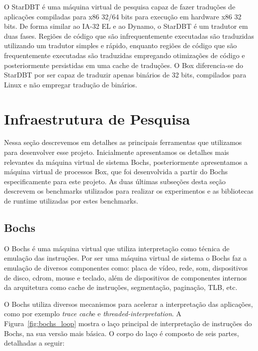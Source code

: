 \documentclass[11pt,twoside]{article}
\begin{document}
O StarDBT \cite{Wang2007} é uma máquina virtual de pesquisa capaz de fazer
traduções de aplicações compiladas para x86 32/64 bits para execução em hardware
x86 32 bits. De forma similar ao IA-32 EL e ao Dynamo, o StarDBT é um tradutor
em duas fases. Regiões de código que são infrequentemente executadas são
traduzidas utilizando um tradutor simples e rápido, enquanto regiões de código
que são frequentemente executadas são traduzidas empregando otimizações de
código e posteriormente persistidas em uma cache de traduções. O Box
diferencia-se do StarDBT por ser capaz de traduzir apenas binários de 32 bits,
compilados para Linux e não empregar tradução de binários.



\section{Infraestrutura de Pesquisa} \label{sec:infraestrutura}

Nessa seção descrevemos em detalhes as principais ferramentas que utilizamos
para desenvolver esse projeto. Inicialmente apresentamos os detalhes mais
relevantes da máquina virtual de sistema Bochs, posteriormente apresentamos a
máquina virtual de processos Box, que foi desenvolvida a partir do Bochs
especificamente para este projeto.  As duas últimas subseções desta seção
descrevem os benchmarks utilizados para realizar os experimentos e as
bibliotecas de runtime utilizadas por estes benchmarks.

\subsection{Bochs}

O Bochs é uma máquina virtual que utiliza interpretação como técnica de emulação
das instruções. Por ser uma máquina virtual de sistema o Bochs faz a emulação de
diversos componentes como: placa de vídeo, rede, som, dispositivos de disco,
cdrom, mouse e teclado, além de dispositivos de componentes internos da
arquitetura como cache de instruções, segmentação, paginação, TLB, etc.

O Bochs utiliza diversos mecanismos para acelerar a interpretação das
aplicações, como por exemplo \emph{trace cach}e e \emph{threaded-interpretation}. A
Figura~\ref{fig:bochs_loop} mostra o laço principal de interpretação de
instruções do Bochs, na sua versão mais básica. O corpo do laço é composto de
seis partes, detalhadas a seguir:
\end{document}
